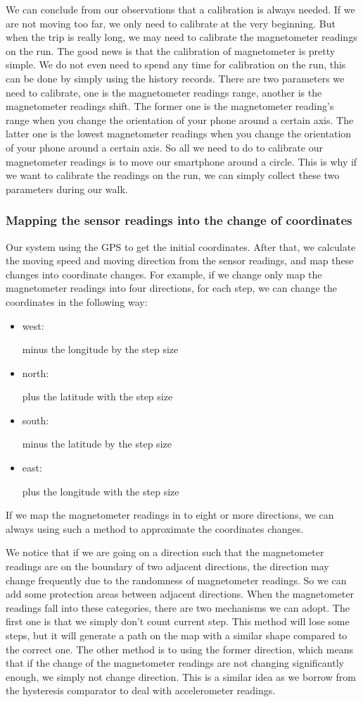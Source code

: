 \documentclass[journal]{IEEEtran}
\begin{document}
We can conclude from our observations that a calibration is always needed.
If we are not moving too far, we only need to calibrate at the very beginning.
But when the trip is really long, we may need to calibrate the magnetometer readings on the run.
The good news is that the calibration of magnetometer is pretty simple. 
We do not even need to spend any time for calibration on the run, this can be done by simply using the history records.
There are two parameters we need to calibrate, one is the magnetometer readings range, another is the magnetometer readings shift.
The former one is the magnetometer reading's range when you change the orientation of your phone around a certain axis.
The latter one is the lowest magnetometer readings when you change the orientation of your phone around a certain axis.
So all we need to do to calibrate our magnetometer readings is to move our smartphone around a circle.
This is why if we want to calibrate the readings on the run, we can simply collect these two parameters during our walk.
\subsubsection{Mapping the sensor readings into the change of coordinates}
Our system using the GPS to get the initial coordinates.
After that, we calculate the moving speed and moving direction from the sensor readings, and map these changes into coordinate changes.
For example, if we change only map the magnetometer readings into four directions, for each step, we can change the coordinates in the following way:
\begin{itemize}
	\item west: 

		minus the longitude by the step size
	\item north: 

		plus the latitude with the step size
	\item south: 

		minus the latitude by the step size
	\item east: 

		plus the longitude with the step size
\end{itemize}

If we map the magnetometer readings in to eight or more directions, we can always using such a method to approximate the coordinates changes.

We notice that if we are going on a direction such that the magnetometer readings are on the boundary of two adjacent directions, the direction may change frequently due to the randomness of magnetometer readings.
So we can add some protection areas between adjacent directions. 
When the magnetometer readings fall into these categories, there are two mechanisms we can adopt.
The first one is that we simply don't count current step.
This method will lose some steps, but it will generate a path on the map with a similar shape compared to the correct one.
The other method is to using the former direction, which means that if the change of the magnetometer readings are not changing significantly enough, we simply not change direction.
This is a similar idea as we borrow from the hysteresis comparator to deal with accelerometer readings.
\end{document}
